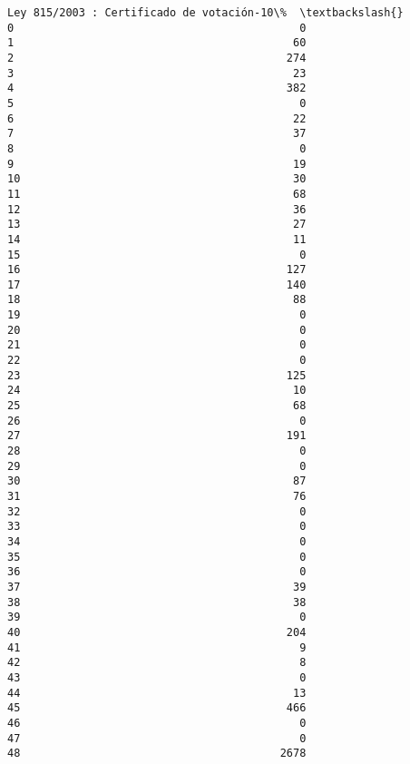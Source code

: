 \documentclass[11pt]{article}
\begin{document}
\begin{Verbatim}[commandchars=\\\{\}]
    Ley 815/2003 : Certificado de votación-10\%  \textbackslash{}
0                                            0   
1                                           60   
2                                          274   
3                                           23   
4                                          382   
5                                            0   
6                                           22   
7                                           37   
8                                            0   
9                                           19   
10                                          30   
11                                          68   
12                                          36   
13                                          27   
14                                          11   
15                                           0   
16                                         127   
17                                         140   
18                                          88   
19                                           0   
20                                           0   
21                                           0   
22                                           0   
23                                         125   
24                                          10   
25                                          68   
26                                           0   
27                                         191   
28                                           0   
29                                           0   
30                                          87   
31                                          76   
32                                           0   
33                                           0   
34                                           0   
35                                           0   
36                                           0   
37                                          39   
38                                          38   
39                                           0   
40                                         204   
41                                           9   
42                                           8   
43                                           0   
44                                          13   
45                                         466   
46                                           0   
47                                           0   
48                                        2678   


\end{Verbatim}
\end{document}
